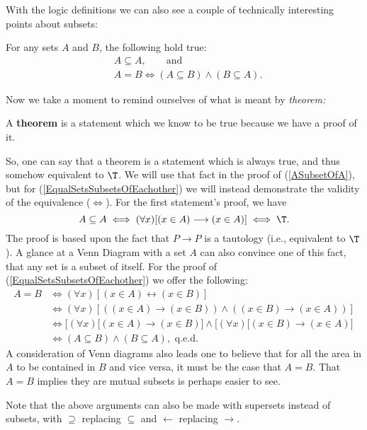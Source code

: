 With the logic definitions we can also see a couple of technically 
interesting points about subsets:
\begin{theorem}
For any sets $A$ and $B$, the following hold true:
\begin{align}&A\subseteq A,\qquad\text{and}\label{ASubsetOfA}\\
             &A=B\iff(A\subseteq B)\wedge(B\subseteq A).
                 \label{EqualSetsSubsetsOfEachother}
\end{align}
\end{theorem}
Now we take a moment to remind ourselves of what is meant by {\it theorem:}
\begin{definition}A {\bf theorem} is a statement which we know to be true
because we have a proof of it.\end{definition}
So, one can say that a theorem is a statement which is always true, and
thus somehow equivalent to $\T$.  We will use that fact in
the proof of (\ref{ASubsetOfA}), but for (\ref{EqualSetsSubsetsOfEachother})
we will instead demonstrate the validity of the equivalence ($\iff$).  
For the first statement's proof, we have
$$A\subseteq A\iff
(\forall x)[(x\in A)\longrightarrow(x\in A)]\iff\T.$$
The proof is based upon the fact that $P\longrightarrow P$ is a tautology
(i.e., equivalent to $\T$). 
A glance at a Venn Diagram with a set $A$ can also convince one of this
fact, that any set is a subset of itself.  For the proof of 
(\ref{EqualSetsSubsetsOfEachother}) we offer the following:
\begin{align*}
A=B&\iff(\forall x)[(x\in A)\longleftrightarrow(x\in B)]\\
   &\iff(\forall x)[((x\in A)\longrightarrow(x\in B))\wedge
                    ((x\in B)\longrightarrow(x\in A))]\\
   &\iff\bigl[(\forall x)[(x\in A)\longrightarrow(x\in B)\bigr]\wedge
        \bigl[(\forall x)[(x\in B)\longrightarrow(x\in A)\bigr]\\
   &\iff(A\subseteq B)\wedge(B\subseteq A),\text{ q.e.d.}
\end{align*}
A consideration of Venn diagrams also leads one to believe that
for all the area in $A$ to be contained in $B$ and vice versa,
it must be the case that $A=B$.  That $A=B$ implies they are
mutual subsets is perhaps easier to see.



Note that the above arguments can also be made with supersets
instead of subsets, with $\supseteq$ replacing $\subseteq$ and
$\longleftarrow$ replacing $\longrightarrow$.


